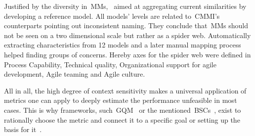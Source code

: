 Justified by the diversity in~\acs{MM}s,~\citet{2013schweigertamm} aimed at aggregating current similarities by developing a reference model. All models' levels are related to~\ac{CMMI}'s counterparts pointing out inconsistent naming. They conclude that~\acs{MM}s should not be seen on a two dimensional scale but rather as a spider web. Automatically extracting characteristics from 12 models and a later manual mapping process helped finding groups of concerns. Hereby axes for the spider web were defined in Process Capability, Technical quality, Organizational support for agile development, Agile teaming and Agile culture. 

All in all, the high degree of context sensitivity makes a universal application of metrics one can apply to deeply estimate the performance unfeasible in most cases. This is why frameworks, such~\ac{GQM}~\citep{victor1994gqm} or the mentioned~\ac{BSCs}~\citep{kaplan1991balancesc}, exist to rationally choose the metric and connect it to a specific goal or setting up the basis for it~\citep{2013schweigertamm}. 